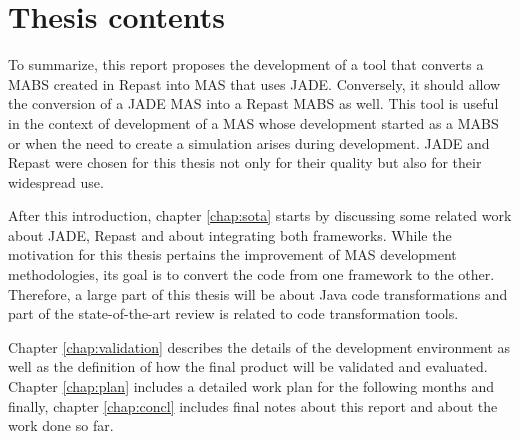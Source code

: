 \section{Thesis contents} \label{sec:struct}

To summarize, this report proposes the development of a tool that converts a MABS created in Repast into MAS that uses JADE. Conversely, it should allow the conversion of a JADE MAS into a Repast MABS as well. This tool is useful in the context of development of a MAS whose development started as a MABS or when the need to create a simulation arises during development. JADE and Repast were chosen for this thesis not only for their quality but also for their widespread use.

After this introduction, chapter \ref{chap:sota} starts by discussing some related work about JADE, Repast and about integrating both frameworks. While the motivation for this thesis pertains the improvement of MAS development methodologies, its goal is to convert the code from one framework to the other. Therefore, a large part of this thesis will be about Java code transformations and part of the state-of-the-art review is related to code transformation tools.

Chapter \ref{chap:validation} describes the details of the development environment as well as the definition of how the final product will be validated and evaluated. Chapter \ref{chap:plan} includes a detailed work plan for the following months and finally, chapter \ref{chap:concl} includes final notes about this report and about the work done so far.